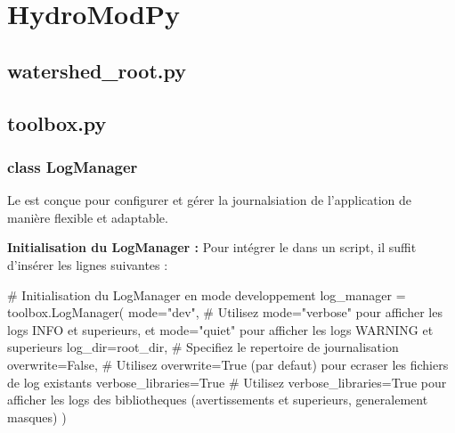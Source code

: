 
\chapter{HydroModPy}
\label{chap:hydromodpy}

\minitableofcontents

\newpage


\section{watershed\_root.py}
\label{sec:watershed_root_py}

\section{toolbox.py}
\label{sec:toolbox_py}

\subsection{class LogManager}
\label{sec:logmanager}

Le  est conçue pour configurer et gérer la journalsiation de l'application de manière flexible et adaptable.

\vspace{1em}

\noindent\textbf{Initialisation du LogManager :}
Pour intégrer le  dans un script, il suffit d'insérer les lignes suivantes :

\begin{pythoncode}[]
    # Initialisation du LogManager en mode developpement
    log_manager = toolbox.LogManager( 
        mode="dev", # Utilisez mode="verbose" pour afficher les logs INFO et superieurs, et mode="quiet" pour afficher les logs WARNING et superieurs 
        log_dir=root_dir, # Specifiez le repertoire de journalisation 
        overwrite=False, # Utilisez overwrite=True (par defaut) pour ecraser les fichiers de log existants 
        verbose_libraries=True # Utilisez verbose_libraries=True pour afficher les logs des bibliotheques (avertissements et superieurs, generalement masques) 
    )
\end{pythoncode}

